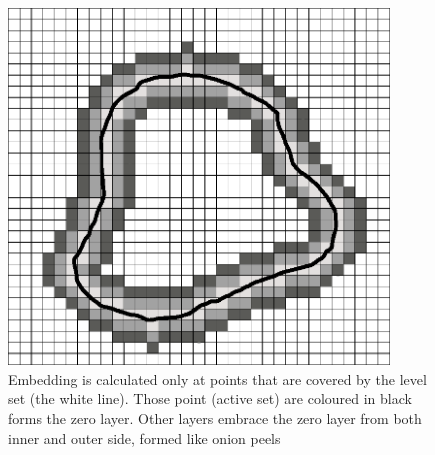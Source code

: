 \begin{figure}
    \centering
    \includegraphics[width=0.9\textwidth]{data/sparsefield}
    \caption[Sparse fields method computation illustration]{Embedding is calculated only at points that are covered by the level set (the white line). Those point (active set) are coloured in black forms the zero layer. Other layers embrace the zero layer from both inner and outer side, formed like onion peels}
    \label{fg:sparseFilelds}
\end{figure}

